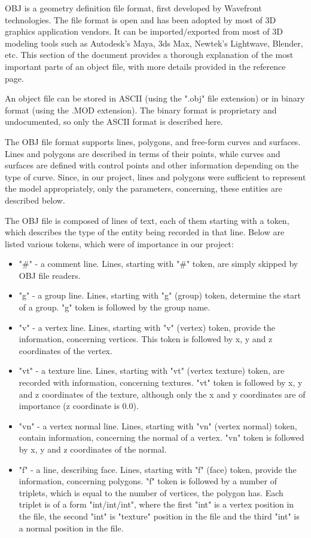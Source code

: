 \documentclass[times, 10pt,twocolumn]{article}
\begin{document}

OBJ is a geometry definition file format, first developed by Wavefront technologies. The file format is open and has been adopted by most of 3D graphics application vendors. It can be imported/exported from most of 3D modeling tools such as Autodesk's Maya, 3ds Max, Newtek's Lightwave, Blender, etc.  This section of the document provides a  thorough explanation of the most important parts of an object file, with more details provided in the reference page.

An object file can be stored in ASCII (using the ".obj" file extension) or in binary format (using the .MOD extension). The binary format is proprietary and undocumented, so only the ASCII format is described here.

The OBJ file format supports lines, polygons, and free-form curves and surfaces. Lines and polygons are described in terms of their points, while curves and surfaces are defined with control points and other information depending on the type of curve. Since, in our project, lines and polygons were sufficient to represent the model appropriately, only the parameters, concerning, these entities are described below.

The OBJ file is composed of lines of text, each of them starting with a token, which describes the type of the entity being  recorded in that line. Below are listed various tokens, which were of importance in our project:

\begin{itemize}
\item "\#" - a comment line. Lines, starting with "\#" token, are simply skipped by OBJ file readers.
\item "g" - a group line. Lines, starting with "g" (group) token, determine the start of a group. "g" token is followed by the group name.
\item "v" - a vertex line. Lines, starting with "v" (vertex) token, provide the information, concerning vertices. This token is followed by x, y and z coordinates of the vertex.
\item "vt" - a texture line. Lines, starting with "vt" (vertex texture) token, are recorded with information, concerning textures. "vt" token is followed by x, y and z coordinates of the texture, although only the x and y coordinates are of importance (z coordinate is 0.0).
\item "vn" - a vertex normal line. Lines, starting with "vn" (vertex normal) token, contain information, concerning the normal of a vertex. "vn" token is followed by x, y and z coordinates of the normal.
\item "f" - a line, describing face. Lines, starting with "f" (face) token, provide the information, concerning polygons. "f" token is followed by a number of triplets, which is equal to the number of vertices, the polygon has. Each triplet is of a form "int/int/int", where the first "int" is a vertex position in the file, the second "int" is "texture" position in the file and the third "int" is a normal position in the file.
\end{itemize}
\end{document}
